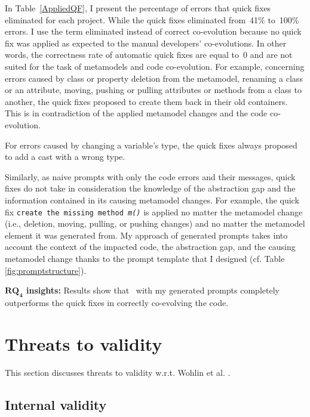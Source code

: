 In Table~\ref{AppliedQF}, I present the percentage of errors that quick fixes eliminated for each project. %
%
While the quick fixes eliminated from~41\% to~100\% errors. I use the term eliminated instead of correct co-evolution because no quick fix was applied as expected to the manual developers' co-evolutions. In other words, the correctness rate of automatic quick fixes are equal to~0 and are not suited for the task of metamodels and code co-evolution.
For example, concerning errors caused by class or property deletion from the metamodel, renaming a class or an attribute, moving, pushing or pulling attributes or methods from a class to another, the quick fixes proposed to create them back in their old containers. This is in contradiction of the applied metamodel changes and the code co-evolution.  

For errors caused by changing a variable's type, the quick fixes always proposed to add a cast with a wrong type. 

Similarly, as naive prompts with only the code errors and their messages, quick fixes do not take in consideration the knowledge of the abstraction gap and the information contained in its causing metamodel changes. For example, the quick fix \texttt{create the missing method \emph{m()}} is applied no matter the metamodel change (i.e., deletion, moving, pulling, or pushing changes) and no matter the metamodel element it was generated from.
My approach of generated prompts takes into account the context of the impacted code, the abstraction gap, and the causing metamodel change thanks to the prompt template that I designed (cf. Table \ref{fig:promptstructure}).

\begin{tcolorbox}[boxsep=-2pt]
	\textbf{$\boldsymbol{RQ_4}$ insights:}
	Results show that \LLM~with my generated prompts completely outperforms the quick fixes in correctly co-evolving the code. 
\end{tcolorbox}


\section{Threats to validity}
This section discusses threats to validity w.r.t. Wohlin et al. \cite{wohlin2012experimentation}.

\subsection{Internal validity} 

